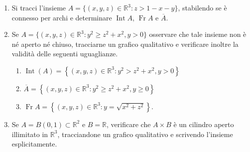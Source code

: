 \begin{enumerate}
	\item Si tracci l'insieme $A = \{(x,y,z)\in \mathbb{R}^3:z > 1 - x - y\}$, stabilendo se è connesso per archi e determinare $\operatorname{Int}A$, $\operatorname{Fr}A$ e $\overline{A}$.
	
	\item Se $A = \{(x,y,z)\in \mathbb{R}^3:y^2\geq z^2 +x^2,y > 0\}$ osservare che tale insieme non è né aperto né chiuso, tracciarne un grafico qualitativo e verificare inoltre la validità delle seguenti uguaglianze.
	\begin{enumerate}
		\item $\operatorname{Int}(A) = \left\{(x,y,z)\in \mathbb{R}^3:y^2 >z^2 +x^2,y > 0\right\}$
		\item $\overline{A} = \left\{(x,y,z)\in \mathbb{R}^3:y^2\geq z^2 +x^2,y\geq 0\right\}$
		\item $\operatorname{Fr}A = \left\{(x,y,z)\in \mathbb{R}^3:y = \sqrt{x^2 + z^2}\right\}$.
	\end{enumerate}
	
	\item Se $A = B(0,1) \subset \mathbb{R}^2$ e $B = \mathbb{R}$, verificare che $A \times B$ è un cilindro aperto illimitato in $\mathbb{R}^3$, tracciandone un grafico qualitativo e scrivendo l'insieme esplicitamente.
\end{enumerate}